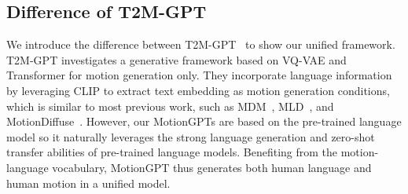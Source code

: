\begin{table}[h]
\centering
{}
\vspace{10pt}
\caption{Evaluation of new task tuning of different size models on HumanML3D~\cite{Guo_2022_CVPR_humanml3d} dataset. 
}
\label{tab:tm:abl:finetune}
\end{table}






\subsection{Difference of T2M-GPT}
\label{sec:appendix:diff}
We introduce the difference between T2M-GPT~\cite{zhang2023generating} to show our unified framework. T2M-GPT investigates a generative framework based on VQ-VAE and Transformer for motion generation only. 
%
They incorporate language information by leveraging CLIP \cite{radford2021clip} to extract text embedding as motion generation conditions, which is similar to most previous work, such as MDM~\cite{mdm2022human}, MLD~\cite{chen2023mld}, and MotionDiffuse~\cite{zhang2022motiondiffuse}.
%
%
However, our MotionGPTs are based on the pre-trained language model so it naturally leverages the strong language generation and zero-shot transfer abilities of pre-trained language models. Benefiting from the motion-language vocabulary, MotionGPT thus generates both human language and human motion in a unified model.

